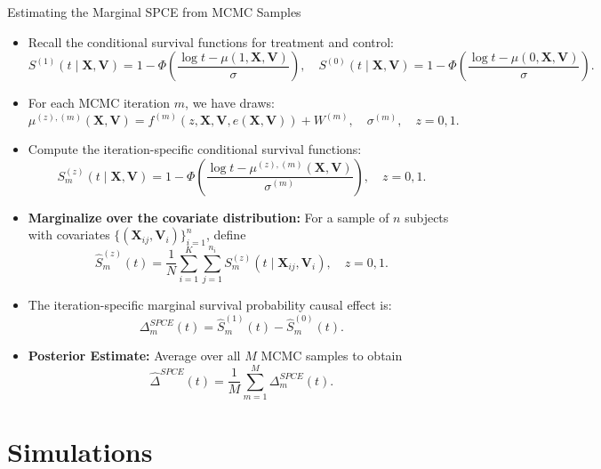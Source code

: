 \begin{frame}{Estimating the Marginal SPCE from MCMC Samples}
  \begin{itemize}
    \item Recall the conditional survival functions for treatment and control:
      \[
      S^{(1)}(t\mid \mathbf{X},\mathbf{V}) = 1 - \Phi\!\left(\frac{\log t - \mu(1,\mathbf{X},\mathbf{V})}{\sigma}\right), \quad
      S^{(0)}(t\mid \mathbf{X},\mathbf{V}) = 1 - \Phi\!\left(\frac{\log t - \mu(0,\mathbf{X},\mathbf{V})}{\sigma}\right).
      \]
    \item For each MCMC iteration \(m\), we have draws:
      \[
      \mu^{(z),(m)}(\mathbf{X},\mathbf{V}) = f^{(m)}(z,\mathbf{X},\mathbf{V},\hat{e}(\mathbf{X},\mathbf{V})) + W^{(m)}, \quad \sigma^{(m)}, \quad z=0,1.
      \]
    \item Compute the iteration-specific conditional survival functions:
      \[
      S^{(z)}_m(t\mid \mathbf{X},\mathbf{V}) = 1 - \Phi\!\left(\frac{\log t - \mu^{(z),(m)}(\mathbf{X},\mathbf{V})}{\sigma^{(m)}}\right), \quad z=0,1.
      \]

    \end{itemize}
\end{frame}
      
\begin{frame}
  \begin{itemize}
    
  \item \textbf{Marginalize over the covariate distribution:} For a sample of \(n\) subjects with covariates \(\{(\mathbf{X}_{ij},\mathbf{V}_i)\}_{i=1}^n\), define
    \[
    \widehat{S}^{(z)}_m(t) = \frac{1}{N} \sum_{i=1}^K\sum_{j=1}^{n_i} S^{(z)}_m(t \mid \mathbf{X}_{ij},\mathbf{V}_i), \quad z=0,1.
    \]
  \item The iteration-specific marginal survival probability causal effect is:
    \[
    \Delta^{SPCE}_m(t) = \widehat{S}^{(1)}_m(t) - \widehat{S}^{(0)}_m(t).
    \]
  \item \textbf{Posterior Estimate:} Average over all \(M\) MCMC samples to obtain
    \[
    \widehat{\Delta}^{SPCE}(t) = \frac{1}{M}\sum_{m=1}^M \Delta^{SPCE}_m(t).
    \]
  \end{itemize}
\end{frame}

\section{Simulations}


